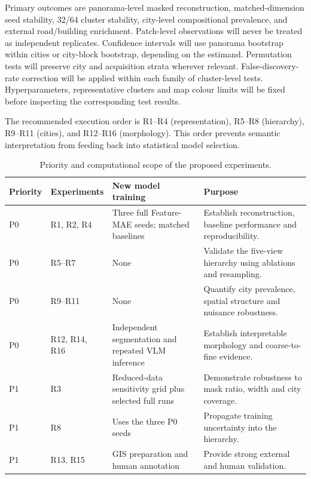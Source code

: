 Primary outcomes are panorama-level masked reconstruction, matched-dimension
seed stability, 32/64 cluster stability, city-level compositional prevalence,
and external road/building enrichment. Patch-level observations will never be
treated as independent replicates. Confidence intervals will use panorama
bootstrap within cities or city-block bootstrap, depending on the estimand.
Permutation tests will preserve city and acquisition strata wherever relevant.
False-discovery-rate correction will be applied within each family of
cluster-level tests. Hyperparameters, representative clusters and map colour
limits will be fixed before inspecting the corresponding test results.

The recommended execution order is R1--R4 (representation), R5--R8 (hierarchy),
R9--R11 (cities), and R12--R16 (morphology). This order prevents semantic
interpretation from feeding back into statistical model selection.

\begin{table}[t]
\centering
\caption{Priority and computational scope of the proposed experiments.}
\label{tab:experiment_priority}
\small
\begin{tabularx}{\textwidth}{@{}lllX@{}}
\toprule
Priority & Experiments & New model training & Purpose \\
\midrule
P0 & R1, R2, R4 & Three full Feature-MAE seeds; matched baselines & Establish reconstruction, baseline performance and reproducibility. \\
P0 & R5--R7 & None & Validate the five-view hierarchy using ablations and resampling. \\
P0 & R9--R11 & None & Quantify city prevalence, spatial structure and nuisance robustness. \\
P0 & R12, R14, R16 & Independent segmentation and repeated VLM inference & Establish interpretable morphology and coarse-to-fine evidence. \\
P1 & R3 & Reduced-data sensitivity grid plus selected full runs & Demonstrate robustness to mask ratio, width and city coverage. \\
P1 & R8 & Uses the three P0 seeds & Propagate training uncertainty into the hierarchy. \\
P1 & R13, R15 & GIS preparation and human annotation & Provide strong external and human validation. \\
\bottomrule
\end{tabularx}
\end{table}
